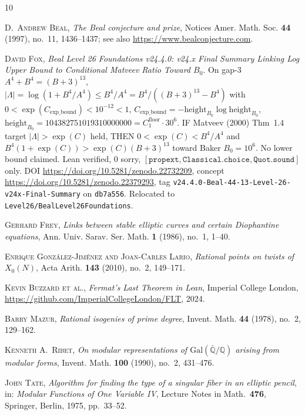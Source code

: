 \documentclass[12pt,reqno]{amsart}
\theoremstyle{plain}
\theoremstyle{definition}
\theoremstyle{remark}
\begin{document}
\begin{thebibliography}{10}

\textsc{D.~Andrew Beal},
\emph{The Beal conjecture and prize},
Notices Amer. Math. Soc. \textbf{44} (1997), no.~11, 1436--1437;
see also \url{https://www.bealconjecture.com}.

\textsc{David Fox},
\emph{Beal Level 26 Foundations v24.4.0: v24.x Final Summary
Linking Log Upper Bound to Conditional Matveev Ratio Toward $B_0$}.
On gap-3 $A^4+B^4=(B+3)^{13}$,
$|\Lambda|=\log(1+B^4/A^4)\le B^4/A^4=B^4/((B+3)^{13}-B^4)$
with $0<\exp(C_{\mathrm{exp\_bound}})<10^{-12}<1$,
$C_{\mathrm{exp\_bound}}=-\mathrm{height}_{B_0}\log\mathrm{height}_{B_0}$,
$\mathrm{height}_{B_0}=104382751019310000000=C_1^{\mathrm{floor}}\cdot 30^6$.
IF Matveev (2000) Thm~1.4 target $|\Lambda|>\exp(C)$ held, THEN
$0<\exp(C)<B^4/A^4$ and
$B^4(1+\exp(C))>\exp(C)(B+3)^{13}$ toward Baker $B_0=10^6$.
No lower bound claimed.
Lean verified, $0$ sorry,
$[\texttt{propext},\texttt{Classical.choice},\texttt{Quot.sound}]$ only.
DOI \url{https://doi.org/10.5281/zenodo.22732209},
concept \url{https://doi.org/10.5281/zenodo.22379293},
tag \texttt{v24.4.0-Beal-44-13-Level-26-v24x-Final-Summary}
on \texttt{db7a556}.
Relocated to \texttt{Level26/BealLevel26Foundations}.

\textsc{Gerhard Frey},
\emph{Links between stable elliptic curves and certain Diophantine equations},
Ann. Univ. Sarav. Ser. Math. \textbf{1} (1986), no.~1, 1--40.

\textsc{Enrique González-Jiménez and Joan-Carles Lario},
\emph{Rational points on twists of $X_0(N)$},
Acta Arith. \textbf{143} (2010), no.~2, 149--171.

\textsc{Kevin Buzzard et al.},
\emph{Fermat's Last Theorem in Lean},
Imperial College London,
\url{https://github.com/ImperialCollegeLondon/FLT}, 2024.

\textsc{Barry Mazur},
\emph{Rational isogenies of prime degree},
Invent. Math. \textbf{44} (1978), no.~2, 129--162.

\textsc{Kenneth A.~Ribet},
\emph{On modular representations of $\mathrm{Gal}(\bar{\mathbb{Q}}/\mathbb{Q})$
arising from modular forms},
Invent. Math. \textbf{100} (1990), no.~2, 431--476.

\textsc{John Tate},
\emph{Algorithm for finding the type of a singular fiber in an elliptic pencil},
in: \emph{Modular Functions of One Variable IV},
Lecture Notes in Math.\ \textbf{476},
Springer, Berlin, 1975, pp.\ 33--52.


\end{thebibliography}
\end{document}
